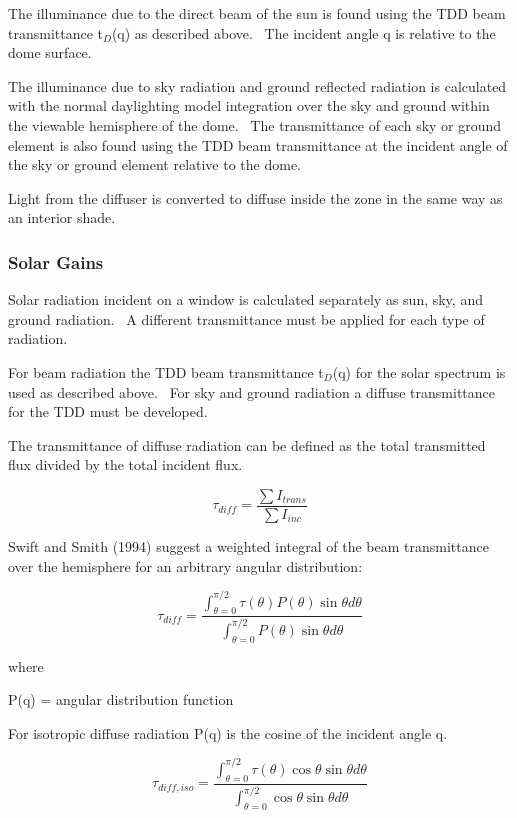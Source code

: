 The illuminance due to the direct beam of the sun is found using the TDD beam transmittance t\(_{D}\)(q) as described above.~ The incident angle q is relative to the dome surface.

The illuminance due to sky radiation and ground reflected radiation is calculated with the normal daylighting model integration over the sky and ground within the viewable hemisphere of the dome.~ The transmittance of each sky or ground~ element is also found using the TDD beam transmittance at the incident angle of the sky or ground element relative to the dome.

Light from the diffuser is converted to diffuse inside the zone in the same way as an interior shade.

\subsubsection{Solar Gains}\label{solar-gains}

Solar radiation incident on a window is calculated separately as sun, sky, and ground radiation.~ A different transmittance must be applied for each type of radiation.

For beam radiation the TDD beam transmittance t\(_{D}\)(q) for the solar spectrum is used as described above.~ For sky and ground radiation a diffuse transmittance for the TDD must be developed.

The transmittance of diffuse radiation can be defined as the total transmitted flux divided by the total incident flux.

\begin{equation}
{\tau_{diff}} = \frac{{\sum {{I_{trans}}} }}{{\sum {{I_{inc}}} }}
\end{equation}

Swift and Smith (1994) suggest a weighted integral of the beam transmittance over the hemisphere for an arbitrary angular distribution:

\begin{equation}
{\tau_{diff}} = \frac{{\int_{\theta  = 0}^{\pi /2} {\tau (\theta )P(\theta )} \sin \theta d\theta }}{{\int_{\theta  = 0}^{\pi /2} {P(\theta )} \sin \theta d\theta }}
\end{equation}

where

P(q) = angular distribution function

For isotropic diffuse radiation P(q) is the cosine of the incident angle q.

\begin{equation}
{\tau_{diff,iso}} = \frac{{\int_{\theta  = 0}^{\pi /2} {\tau (\theta )\cos \theta } \sin \theta d\theta }}{{\int_{\theta  = 0}^{\pi /2} {\cos \theta } \sin \theta d\theta }}
\end{equation}

